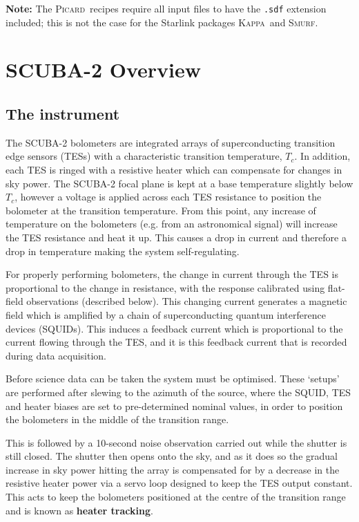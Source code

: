 \documentclass[twoside,11pt]{article}
\newcommand{\xref}[3]{#1}
\newcommand{\xlabel}[1]{}
\renewcommand{\_}{\texttt{\symbol{95}}}
\newcommand{\Kappa}{\xref{\textsc{Kappa}}{sun95}{}}
\newcommand{\picard}{\xref{\textsc{Picard}}{sun265}{}}
\newcommand{\smurf}{\xref{\textsc{Smurf}}{sun258}{}}
\begin{document}
\textbf{Note:} The \picard\ recipes require all input files to have
the \texttt{.sdf} extension included; this is not the case for the
Starlink packages \Kappa\ and \smurf.

\clearpage
\section{\xlabel{scuba2_overview}SCUBA-2 Overview}
\subsection{\xlabel{scuba2}The instrument}
\label{sec:s2}

The SCUBA-2 bolometers are integrated arrays of superconducting
transition edge sensors (TESs) with a characteristic transition
temperature, $T_c$. In addition, each TES is ringed with a resistive
heater which can compensate for changes in sky power. The SCUBA-2
focal plane is kept at a base temperature slightly below $T_c$,
however a voltage is applied across each TES resistance to position
the bolometer at the transition temperature.  From this point, any
increase of temperature on the bolometers (e.g. from an astronomical
signal) will increase the TES resistance and heat it up. This causes a
drop in current and therefore a drop in temperature making the system
self-regulating.

For properly performing bolometers, the change in current through the
TES is proportional to the change in resistance, with the response
calibrated using flat-field observations (described below). This
changing current generates a magnetic field which is amplified by a
chain of superconducting quantum interference devices (SQUIDs). This
induces a feedback current which is proportional to the current
flowing through the TES, and it is this feedback current that is
recorded during data acquisition.


Before science data can be taken the system must be optimised. These
`setups' are performed after slewing to the azimuth of the source,
where the SQUID, TES and heater biases are set to pre-determined
nominal values, in order to position the bolometers in the middle of
the transition range.

This is followed by a 10-second noise observation carried out while
the shutter is still closed. The shutter then opens onto the sky, and
as it does so the gradual increase in sky power hitting the array is
compensated for by a decrease in the resistive heater power via a
servo loop designed to keep the TES output constant. This acts to keep
the bolometers positioned at the centre of the transition range and is
known as \textbf{heater tracking}.
\end{document}
